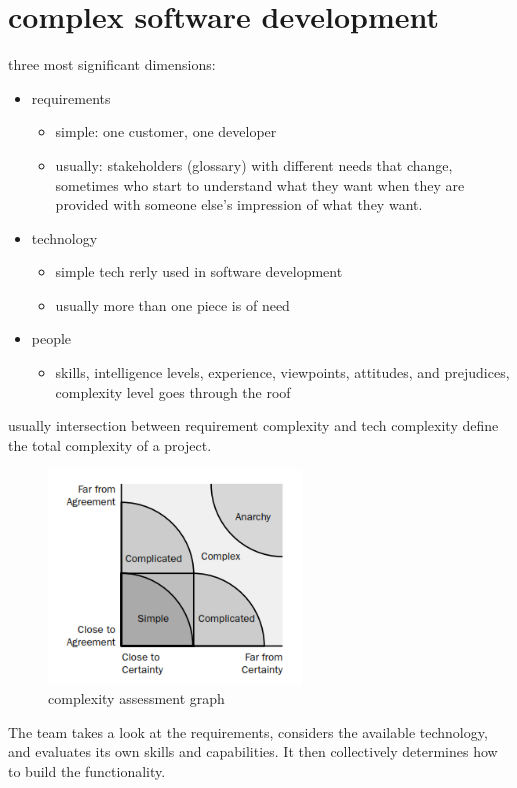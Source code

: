 \section{complex software development}

three most significant dimensions:  

\begin{itemize}
  \item requirements
  \begin{itemize}
    \item simple: one customer, one developer
    \item usually: stakeholders (glossary) with different needs that change, sometimes who start to understand what they want when they are
    provided with someone else’s impression of what they want.
  \end{itemize}
  \item technology
  \begin{itemize}
    \item simple tech rerly used in software development
    \item usually more than one piece is of need
  \end{itemize}
  \item people
  \begin{itemize}
    \item skills, intelligence levels, experience, viewpoints, attitudes, and prejudices, complexity level
    goes through the roof
  \end{itemize}
\end{itemize}

usually intersection between requirement complexity and tech complexity define the total complexity of a project. 

\begin{figure}[H]
  \centering
  \includegraphics[width=0.6\textwidth]{./figures/chapter_1/complexity_assessment_graph.PNG}
  \caption{complexity assessment graph}
  \label{fig:ch1-complexity_assessment_graph}
\end{figure}\bigskip

The team takes a look at the requirements, considers the available technology, and evaluates its own skills and capabilities. It then collectively determines how to build the functionality.



